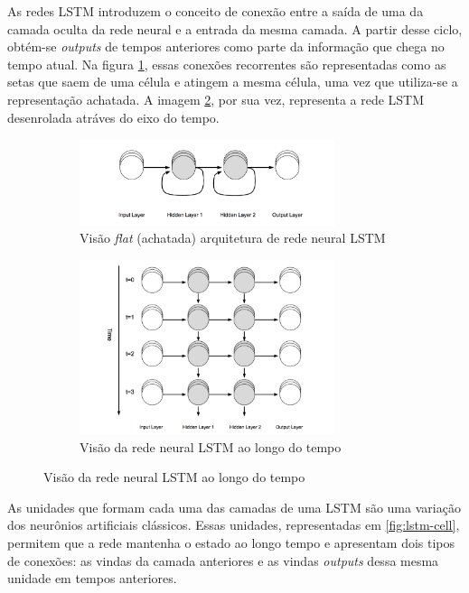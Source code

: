 As redes LSTM introduzem o conceito de conexão entre a saída de uma da 
camada oculta da rede neural e a entrada da mesma camada. A partir desse
ciclo, obtém-se \textit{outputs} de tempos anteriores como parte da informação que 
chega no tempo atual. Na figura \ref{fig:arq-rnn-flat}, essas 
conexões recorrentes são representadas como as setas que saem de uma célula e 
atingem a mesma célula, uma vez que utiliza-se a representação achatada.
A imagem \ref{fig:arq-rnnff}, por sua vez, representa a rede LSTM desenrolada 
atráves do eixo do tempo.

\begin{figure}[H]
  \centering
  \begin{subfigure}{7.5cm}
      \centering
      \includegraphics[width=7.5cm]{../figuras/redes/arq-rnn-flat.png}
      \caption{Visão \textit{flat} (achatada) arquitetura de rede neural LSTM }
      \label{fig:arq-rnn-flat}
  \end{subfigure}
  \begin{subfigure}{7.5cm}
    \centering
    \includegraphics[width=7.5cm]{../figuras/redes/arq-rnn.png}
    \caption{Visão da rede neural LSTM ao longo do tempo}
    \label{fig:arq-rnnff}
  \end{subfigure}
  \hfill
  \label{fig:comparacao-rnn-flat-normal}
\end{figure}

As unidades que formam cada uma das camadas de uma LSTM são uma variação dos
neurônios artificiais clássicos. Essas unidades, representadas em \ref{fig:lstm-cell},
 permitem que a rede mantenha o estado
ao longo tempo e apresentam dois tipos de 
conexões: as vindas da camada anteriores e as vindas \textit{outputs} dessa
mesma unidade em tempos anteriores.

